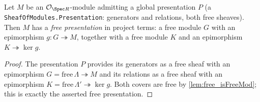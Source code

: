 \begin{lemma}

  \label{lem:exists_free_presentation_of_presentation}
  Let $M$ be an $\mathcal{O}_{\Spec R}$-module admitting a global presentation
  $P$ (a \texttt{SheafOfModules.Presentation}: generators and relations, both
  free sheaves). Then $M$ has a \emph{free presentation} in project terms: a
  free module $G$ with an epimorphism $g : G \twoheadrightarrow M$, together with
  a free module $K$ and an epimorphism $K \twoheadrightarrow \ker g$.
  \begin{proof}
    The presentation $P$ provides its generators as a free sheaf with an
    epimorphism $G = \mathrm{free}\,\Lambda \twoheadrightarrow M$ and its
    relations as a free sheaf with an epimorphism
    $K = \mathrm{free}\,\Lambda' \twoheadrightarrow \ker g$. Both covers are free
    by \cref{lem:free_isFreeMod}; this is exactly the asserted free presentation.
  \end{proof}
\end{lemma}

